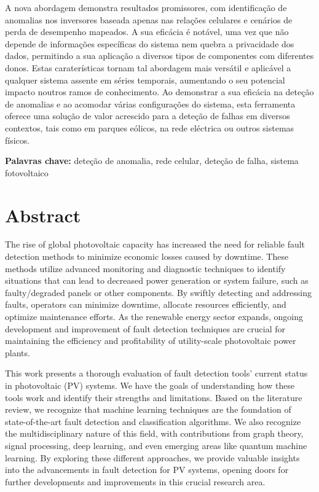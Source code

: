 A nova abordagem demonstra resultados promissores, com identificação de anomalias nos inversores baseada apenas nas relações celulares e cenários de perda de desempenho mapeados. A sua eficácia é notável, uma vez que não depende de informações específicas do sistema nem quebra a privacidade dos dados, permitindo a sua aplicação a diversos tipos de componentes com diferentes donos. Estas caraterísticas tornam tal abordagem mais versátil e aplicável a qualquer sistema assente em séries temporais, aumentando o seu potencial impacto noutros ramos de conhecimento. Ao demonstrar a sua eficácia na deteção de anomalias e ao acomodar várias configurações do sistema, esta ferramenta oferece uma solução de valor acrescido para a deteção de falhas em diversos contextos, tais como em parques eólicos, na rede eléctrica ou outros sistemas físicos.

\bigskip

\textbf{Palavras chave:} deteção de anomalia, rede celular, deteção de falha, sistema fotovoltaico

\chapter*{Abstract}
The rise of global photovoltaic capacity has increased the need for reliable fault detection methods to minimize economic losses caused by downtime. These methods utilize advanced monitoring and diagnostic techniques to identify situations that can lead to decreased power generation or system failure, such as faulty/degraded panels or other components. By swiftly detecting and addressing faults, operators can minimize downtime, allocate resources efficiently, and optimize maintenance efforts. As the renewable energy sector expands, ongoing development and improvement of fault detection techniques are crucial for maintaining the efficiency and profitability of utility-scale photovoltaic power plants.

This work presents a thorough evaluation of fault detection tools' current status in photovoltaic (PV) systems. We have the goals of understanding how these tools work and identify their strengths and limitations. Based on the literature review, we recognize that machine learning techniques are the foundation of state-of-the-art fault detection and classification algorithms. We also recognize the multidisciplinary nature of this field, with contributions from graph theory, signal processing, deep learning, and even emerging areas like quantum machine learning. By exploring these different approaches, we provide valuable insights into the advancements in fault detection for PV systems, opening doors for further developments and improvements in this crucial research area.

